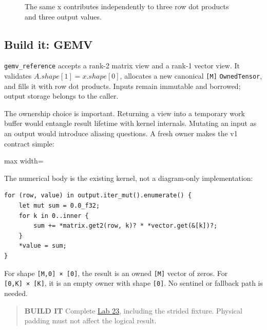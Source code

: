 \documentclass[
  10pt,
]{article}
\begin{document}
\begin{figure}[H]\centering\resizebox{\linewidth}{!}{}\caption{The same x contributes independently to three row dot products and three output values.}\end{figure}

\subsection{Build it: GEMV}\label{build-it-gemv}

\texttt{gemv\_reference} accepts a rank-2 matrix view and a rank-1
vector view. It validates \(A.shape[1]=x.shape[0]\), allocates a new
canonical \texttt{{[}M{]}} \texttt{OwnedTensor}, and fills it with row
dot products. Inputs remain immutable and borrowed; output storage
belongs to the caller.

The ownership choice is important. Returning a view into a temporary
work buffer would entangle result lifetime with kernel internals.
Mutating an input as an output would introduce aliasing questions. A
fresh owner makes the v1 contract simple:

\begin{center}\begin{adjustbox}{max width=\linewidth}\end{adjustbox}\end{center}

The numerical body is the existing kernel, not a diagram-only
implementation:

\begin{verbatim}
for (row, value) in output.iter_mut().enumerate() {
    let mut sum = 0.0_f32;
    for k in 0..inner {
        sum += *matrix.get2(row, k)? * *vector.get(&[k])?;
    }
    *value = sum;
}
\end{verbatim}

For shape \texttt{{[}M,0{]}\ ×\ {[}0{]}}, the result is an owned
\texttt{{[}M{]}} vector of zeros. For \texttt{{[}0,K{]}\ ×\ {[}K{]}}, it
is an empty owner with shape \texttt{{[}0{]}}. No sentinel or fallback
path is needed.

\begin{quote}
\textbf{BUILD IT} Complete
\href{https://github.com/hermonai/inside-the-llm-engine/blob/astra-visual-rewrite/labs/lab-23-gemv-by-hand.md}{Lab
23}, including the strided fixture. Physical padding must not affect the
logical result.
\end{quote}
\end{document}
